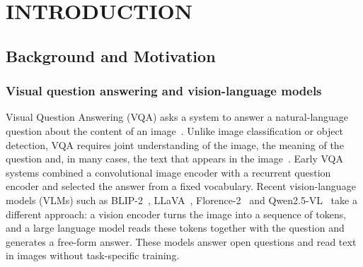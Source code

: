 
\chapter{INTRODUCTION}  %
\label{chap:intro}

\ifpdf
    \graphicspath{{Chapter1/Figs/Raster/}{Chapter1/Figs/PDF/}{Chapter1/Figs/}}
\else
    \graphicspath{{Chapter1/Figs/Vector/}{Chapter1/Figs/}}
\fi


\section{Background and Motivation}
\label{sec:intro-background}

\subsection{Visual question answering and vision-language models}

Visual Question Answering (VQA) asks a system to answer a natural-language
question about the content of an image~\cite{antol2015vqa}. Unlike image
classification or object detection, VQA requires joint understanding of the
image, the meaning of the question and, in many cases, the text that appears
in the image~\cite{singh2019textvqa,biten2019stvqa}. Early VQA systems combined
a convolutional image encoder with a recurrent question encoder and selected the
answer from a fixed vocabulary. Recent vision-language models (VLMs) such as
BLIP-2~\cite{li2023blip2}, LLaVA~\cite{liu2023llava},
Florence-2~\cite{xiao2024florence2} and Qwen2.5-VL~\cite{bai2025qwen25vl} take a
different approach: a vision encoder turns the image into a sequence of tokens,
and a large language model reads these tokens together with the question and
generates a free-form answer. These models answer open questions and read text
in images without task-specific training.

